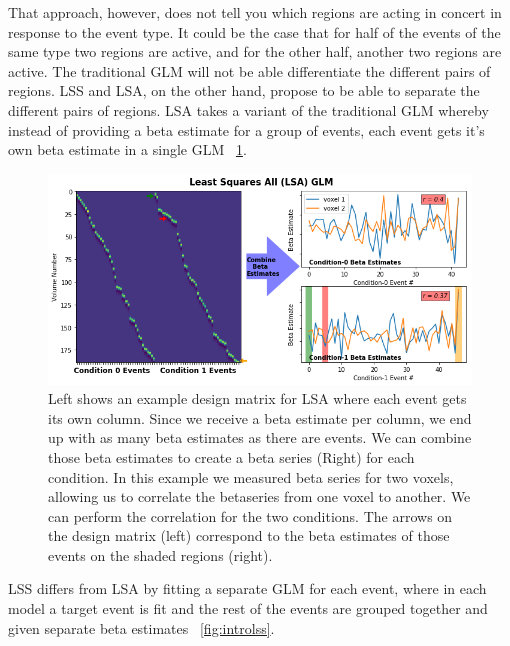 \documentclass[10pt,letterpaper]{article}
\begin{document}
That approach, however, does not tell you which regions are acting in concert
in response to the event type.
It could be the case that for half of the events of the same type two regions are active,
and for the other half, another two regions are active.
The traditional GLM will not be able differentiate the different pairs of regions.
LSS and LSA, on the other hand, propose to be able to separate the different pairs of regions.
LSA takes a variant of the traditional GLM whereby instead of providing a beta
estimate for a group of events, each event gets it's own beta estimate in a single GLM ~\ref{fig:introlsa}.

\begin{figure}[H]
  \centering
  \includegraphics[width=\textwidth]{introduction-lsa}
  \caption{
    Left shows an example design matrix for LSA where each event gets its own column.
    Since we receive a beta estimate per column, we end up with as many beta estimates as there
    are events.
    We can combine those beta estimates to create a beta series (Right) for each condition.
    In this example we measured beta series for two voxels, allowing us to
    correlate the betaseries from one voxel to another.
    We can perform the correlation for the two conditions.
    The arrows on the design matrix (left) correspond to the beta estimates of those events
    on the shaded regions (right).
  }
  \label{fig:introlsa}
\end{figure}

LSS differs from LSA by fitting a separate GLM for each event, where in each model a target
event is fit and the rest of the events are grouped together and given separate beta estimates ~\ref{fig:introlss}.
\end{document}
